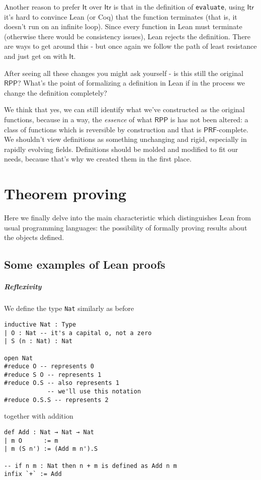 \documentclass{book}
\theoremstyle{definition}
\theoremstyle{remark}
\theoremstyle{plain}
\newcommand{\RPP}{\mathsf{RPP}}
\newcommand{\rppIt}{\mathsf{It}}
\newcommand{\rppItr}{\mathsf{Itr}}
\newcommand{\PRF}{\mathsf{PRF}}
\begin{document}
\begin{itemize}
Another reason to prefer $\rppIt$ over $\rppItr$ is that in the definition of \lstinline{evaluate},
using $\rppItr$ it's hard to convince Lean (or Coq) that the function terminates (that is, it doesn't run on an infinite loop).
Since every function in Lean must terminate (otherwise there would be consistency issues), Lean rejects the definition.
There are ways to get around this - but once again we follow the path of least resistance and just get on with $\rppIt$.
\end{itemize}

After seeing all these changes you might ask yourself - is this still the original $\RPP$?
What's the point of formalizing a definition in Lean if in the process we change the definition completely?

We think that yes, we can still identify what we've constructed as the original functions,
because in a way, the \textit{essence} of what $\RPP$ is has not been altered:
a class of functions which is reversible by construction and that is $\PRF$-complete.
We shouldn't view definitions as something unchanging and rigid, especially in rapidly evolving fields.
Definitions should be molded and modified to fit our needs,
because that's why we created them in the first place.


\chapter{Theorem proving}

Here we finally delve into the main characteristic which distinguishes Lean from usual programming languages:
the possibility of formally proving results about the objects defined.

\section{Some examples of Lean proofs}

\paragraph{Reflexivity}

We define the type \lstinline{Nat} similarly as before
\begin{lstlisting}
inductive Nat : Type
| O : Nat -- it's a capital o, not a zero
| S (n : Nat) : Nat

open Nat
#reduce O -- represents 0
#reduce S O -- represents 1
#reduce O.S -- also represents 1
            -- we'll use this notation
#reduce O.S.S -- represents 2

\end{lstlisting}
together with addition
\begin{lstlisting}
def Add : Nat → Nat → Nat
| m O      := m
| m (S n') := (Add m n').S  

-- if n m : Nat then n + m is defined as Add n m
infix `+` := Add
\end{lstlisting}
  
\end{document}
